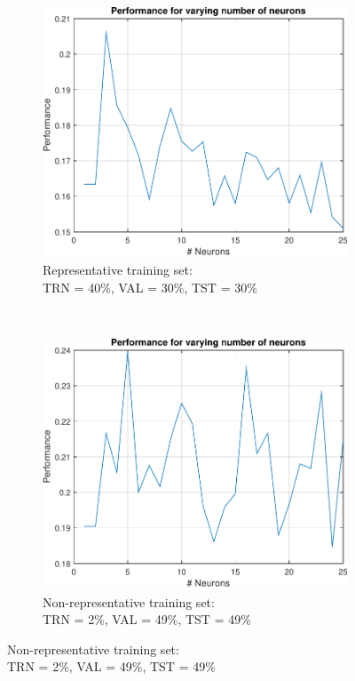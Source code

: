 \documentclass[12pt, a4paper]{article}
\begin{document}
\begin{figure}[htbp]
		\centering
		\begin{subfigure}[b]{0.48\textwidth}
			\includegraphics[width=\textwidth]{Q7-representative}
			\caption{Representative training set:\\ TRN = 40\%, VAL = 30\%, TST = 30\%}
			\label{Q7-repr}
		\end{subfigure}
		~
		\begin{subfigure}[b]{0.48\textwidth}
			\includegraphics[width=\textwidth]{Q7-non-representative-train}
			\caption{Non-representative training set:\\ TRN = 2\%, VAL = 49\%, TST = 49\%}

\end{subfigure}
\end{figure}
\end{document}
